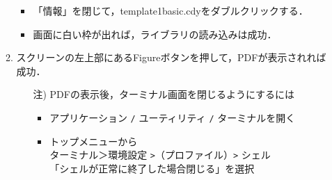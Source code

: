 \documentclass{ujarticle}
\begin{document}
\begin{enumerate}[\bf\large 1.]
\begin{enumerate}[(1)]
\begin{itemize}
      \item「情報」を閉じて，template1basic.cdyをダブルクリックする．
      \item 画面に白い枠が出れば，ライブラリの読み込みは成功．
      \end{itemize}
    \item スクリーンの左上部にあるFigureボタンを押して，PDFが表示されれば成功．
     \begin{itemize}
     \item[注)]PDFの表示後，ターミナル画面を閉じるようにするには
       \begin{itemize}
        \item アプリケーション \verb|/| ユーティリティ \verb|/| ターミナルを開く
        \item トップメニューから\\
          \hspace*{5mm}ターミナル＞環境設定 \verb|>|（プロファイル）\verb|>| シェル\\
          \hspace*{10mm}「シェルが正常に終了した場合閉じる」を選択
        \end{itemize}
     \end{itemize} 
  \end{enumerate}


\end{enumerate}
\end{document}
